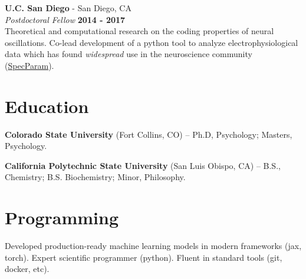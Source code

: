 \documentclass[margin,line]{res}
\newenvironment{list1}{
    \begin{list}{\ding{113}}{%
        \setlength{\itemsep}{0in}
        \setlength{\parsep}{0in} \setlength{\parskip}{0in}
        \setlength{\topsep}{0in} \setlength{\partopsep}{0in}
        \setlength{\leftmargin}{0.17in}}}{
    \end{list}}
\begin{document}
\begin{resume}
\vspace{-.1cm}
{\bf U.C. San Diego} - San Diego, CA\\
{\em Postdoctoral Fellow} \hfill {\bf 2014 - 2017}\\
Theoretical and computational research on the coding properties of neural oscillations. Co-lead development of a python tool to analyze electrophysiological data which has found \emph{widespread} use in the neuroscience community (\href{https://github.com/fooof-tools/fooof}{SpecParam}).

\vspace{-.2cm}
\section{\sc Education}
{\bf Colorado State University} (Fort Collins, CO) --  Ph.D, Psychology; Masters, Psychology.\\
\vspace*{-.15in}

\vspace*{-.15in}
{\bf California Polytechnic State University} (San Luis Obispo, CA) -- B.S., Chemistry; B.S. Biochemistry; Minor, Philosophy.\\


\vspace{-.6cm}
\section{\sc Programming} Developed production-ready machine learning models in modern frameworks (jax, torch). Expert scientific programmer (python). Fluent in standard tools (git, docker, etc).



\end{resume}
\end{document}

